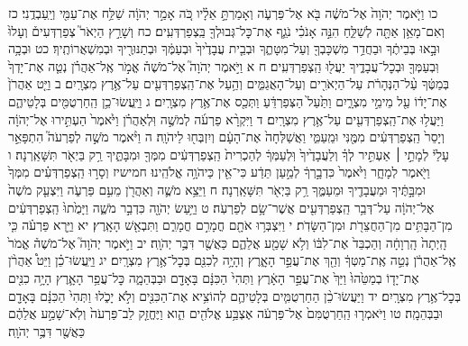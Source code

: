 \documentclass[twoside, openany, parskip=half, 11pt]{book}
\begin{document}
כו וַיֹּ֤אמֶר יְהֹוָה֙ אֶל־מֹשֶׁ֔ה בֹּ֖א אֶל־פַּרְעֹ֑ה וְאָמַרְתָּ֣ אֵלָ֗יו כֹּ֚ה אָמַ֣ר יְהֹוָ֔ה שַׁלַּ֥ח אֶת־עַמִּ֖י וְיַֽעַבְדֻֽנִי׃ כז וְאִם־מָאֵ֥ן אַתָּ֖ה לְשַׁלֵּ֑חַ הִנֵּ֣ה אָנֹכִ֗י נֹגֵ֛ף אֶת־כׇּל־גְּבוּלְךָ֖ בַּֽצְפַרְדְּעִֽים׃ כח וְשָׁרַ֣ץ הַיְאֹר֮ צְפַרְדְּעִים֒ וְעָלוּ֙ וּבָ֣אוּ בְּבֵיתֶ֔ךָ וּבַחֲדַ֥ר מִשְׁכָּבְךָ֖ וְעַל־מִטָּתֶ֑ךָ וּבְבֵ֤ית עֲבָדֶ֙יךָ֙ וּבְעַמֶּ֔ךָ וּבְתַנּוּרֶ֖יךָ וּבְמִשְׁאֲרוֹתֶֽיךָ׃ כט וּבְכָ֥ה וּֽבְעַמְּךָ֖ וּבְכׇל־עֲבָדֶ֑יךָ יַעֲל֖וּ הַֽצְפַרְדְּעִֽים׃ ח א וַיֹּ֣אמֶר יְהֹוָה֮ אֶל־מֹשֶׁה֒ אֱמֹ֣ר אֶֽל־אַהֲרֹ֗ן נְטֵ֤ה אֶת־יָדְךָ֙ בְּמַטֶּ֔ךָ עַ֨ל־הַנְּהָרֹ֔ת עַל־הַיְאֹרִ֖ים וְעַל־הָאֲגַמִּ֑ים וְהַ֥עַל אֶת־הַֽצְפַרְדְּעִ֖ים עַל־אֶ֥רֶץ מִצְרָֽיִם׃ ב וַיֵּ֤ט אַהֲרֹן֙ אֶת־יָד֔וֹ עַ֖ל מֵימֵ֣י מִצְרָ֑יִם וַתַּ֙עַל֙ הַצְּפַרְדֵּ֔עַ וַתְּכַ֖ס אֶת־אֶ֥רֶץ מִצְרָֽיִם׃ ג וַיַּֽעֲשׂוּ־כֵ֥ן הַֽחַרְטֻמִּ֖ים בְּלָטֵיהֶ֑ם וַיַּעֲל֥וּ אֶת־הַֽצְפַרְדְּעִ֖ים עַל־אֶ֥רֶץ מִצְרָֽיִם׃ ד וַיִּקְרָ֨א פַרְעֹ֜ה לְמֹשֶׁ֣ה וּֽלְאַהֲרֹ֗ן וַיֹּ֙אמֶר֙ הַעְתִּ֣ירוּ אֶל־יְהֹוָ֔ה וְיָסֵר֙ הַֽצְפַרְדְּעִ֔ים מִמֶּ֖נִּי וּמֵֽעַמִּ֑י וַאֲשַׁלְּחָה֙ אֶת־הָעָ֔ם וְיִזְבְּח֖וּ לַיהֹוָֽה׃ ה וַיֹּ֨אמֶר מֹשֶׁ֣ה לְפַרְעֹה֮ הִתְפָּאֵ֣ר עָלַי֒ לְמָתַ֣י ׀ אַעְתִּ֣יר לְךָ֗ וְלַעֲבָדֶ֙יךָ֙ וּֽלְעַמְּךָ֔ לְהַכְרִית֙ הַֽצְפַרְדְּעִ֔ים מִמְּךָ֖ וּמִבָּתֶּ֑יךָ רַ֥ק בַּיְאֹ֖ר תִּשָּׁאַֽרְנָה׃ ו וַיֹּ֖אמֶר לְמָחָ֑ר וַיֹּ֙אמֶר֙ כִּדְבָ֣רְךָ֔ לְמַ֣עַן תֵּדַ֔ע כִּי־אֵ֖ין כַּיהֹוָ֥ה אֱלֹהֵֽינוּ׃ חמישיז וְסָר֣וּ הַֽצְפַרְדְּעִ֗ים מִמְּךָ֙ וּמִבָּ֣תֶּ֔יךָ וּמֵעֲבָדֶ֖יךָ וּמֵעַמֶּ֑ךָ רַ֥ק בַּיְאֹ֖ר תִּשָּׁאַֽרְנָה׃ ח וַיֵּצֵ֥א מֹשֶׁ֛ה וְאַהֲרֹ֖ן מֵעִ֣ם פַּרְעֹ֑ה וַיִּצְעַ֤ק מֹשֶׁה֙ אֶל־יְהֹוָ֔ה עַל־דְּבַ֥ר הַֽצְפַרְדְּעִ֖ים אֲשֶׁר־שָׂ֥ם לְפַרְעֹֽה׃ ט וַיַּ֥עַשׂ יְהֹוָ֖ה כִּדְבַ֣ר מֹשֶׁ֑ה וַיָּמֻ֙תוּ֙ הַֽצְפַרְדְּעִ֔ים מִן־הַבָּתִּ֥ים מִן־הַחֲצֵרֹ֖ת וּמִן־הַשָּׂדֹֽת׃ י וַיִּצְבְּר֥וּ אֹתָ֖ם חֳמָרִ֣ם חֳמָרִ֑ם וַתִּבְאַ֖שׁ הָאָֽרֶץ׃ יא וַיַּ֣רְא פַּרְעֹ֗ה כִּ֤י הָֽיְתָה֙ הָֽרְוָחָ֔ה וְהַכְבֵּד֙ אֶת־לִבּ֔וֹ וְלֹ֥א שָׁמַ֖ע אֲלֵהֶ֑ם כַּאֲשֶׁ֖ר דִּבֶּ֥ר יְהֹוָֽה׃
יב וַיֹּ֣אמֶר יְהֹוָה֮ אֶל־מֹשֶׁה֒ אֱמֹר֙ אֶֽל־אַהֲרֹ֔ן נְטֵ֣ה אֶֽת־מַטְּךָ֔ וְהַ֖ךְ אֶת־עֲפַ֣ר הָאָ֑רֶץ וְהָיָ֥ה לְכִנִּ֖ם בְּכׇל־אֶ֥רֶץ מִצְרָֽיִם׃ יג וַיַּֽעֲשׂוּ־כֵ֗ן וַיֵּט֩ אַהֲרֹ֨ן אֶת־יָד֤וֹ בְמַטֵּ֙הוּ֙ וַיַּךְ֙ אֶת־עֲפַ֣ר הָאָ֔רֶץ וַתְּהִי֙ הַכִּנָּ֔ם בָּאָדָ֖ם וּבַבְּהֵמָ֑ה כׇּל־עֲפַ֥ר הָאָ֛רֶץ הָיָ֥ה כִנִּ֖ים בְּכׇל־אֶ֥רֶץ מִצְרָֽיִם׃ יד וַיַּעֲשׂוּ־כֵ֨ן הַחַרְטֻמִּ֧ים בְּלָטֵיהֶ֛ם לְהוֹצִ֥יא אֶת־הַכִּנִּ֖ים וְלֹ֣א יָכֹ֑לוּ וַתְּהִי֙ הַכִּנָּ֔ם בָּאָדָ֖ם וּבַבְּהֵמָֽה׃ טו וַיֹּאמְר֤וּ הַֽחַרְטֻמִּם֙ אֶל־פַּרְעֹ֔ה אֶצְבַּ֥ע אֱלֹהִ֖ים הִ֑וא וַיֶּחֱזַ֤ק לֵב־פַּרְעֹה֙ וְלֹֽא־שָׁמַ֣ע אֲלֵהֶ֔ם כַּאֲשֶׁ֖ר דִּבֶּ֥ר יְהֹוָֽה׃
\end{document}
